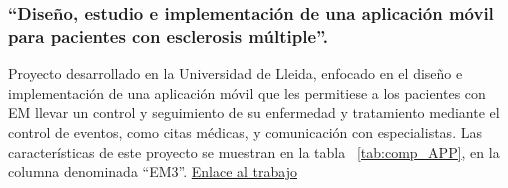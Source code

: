 \subsubsection{“Diseño, estudio e implementación de una aplicación móvil para pacientes con esclerosis múltiple”.}
Proyecto desarrollado en la Universidad de Lleida, enfocado en el diseño e implementación de una aplicación móvil que les permitiese a los pacientes con EM llevar un control y seguimiento de su enfermedad y tratamiento mediante el control de eventos, como citas médicas, y comunicación con especialistas. Las características de este proyecto se muestran en la tabla ~\ref{tab:comp_APP}, en la columna denominada “EM3”.
\href{https://repositori.udl.cat/handle/10459.1/69628}{Enlace al trabajo}

\newpage
\begin{table}[]
\centering
{}
\end{table}
